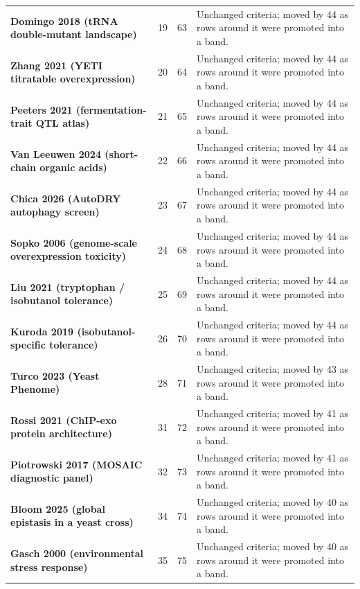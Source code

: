 \begin{longtable}{@{}L{46mm} r@{\hspace{6pt}} r@{\hspace{6pt}} L{104mm}@{}}
\addlinespace[5pt]
\textbf{Domingo 2018 (tRNA double-mutant landscape)} & 19 & 63 & Unchanged criteria; moved by 44 as rows around it were promoted into a band. \\
\addlinespace[5pt]
\textbf{Zhang 2021 (YETI titratable overexpression)} & 20 & 64 & Unchanged criteria; moved by 44 as rows around it were promoted into a band. \\
\addlinespace[5pt]
\textbf{Peeters 2021 (fermentation-trait QTL atlas)} & 21 & 65 & Unchanged criteria; moved by 44 as rows around it were promoted into a band. \\
\addlinespace[5pt]
\textbf{Van Leeuwen 2024 (short-chain organic acids)} & 22 & 66 & Unchanged criteria; moved by 44 as rows around it were promoted into a band. \\
\addlinespace[5pt]
\textbf{Chica 2026 (AutoDRY autophagy screen)} & 23 & 67 & Unchanged criteria; moved by 44 as rows around it were promoted into a band. \\
\addlinespace[5pt]
\textbf{Sopko 2006 (genome-scale overexpression toxicity)} & 24 & 68 & Unchanged criteria; moved by 44 as rows around it were promoted into a band. \\
\addlinespace[5pt]
\textbf{Liu 2021 (tryptophan / isobutanol tolerance)} & 25 & 69 & Unchanged criteria; moved by 44 as rows around it were promoted into a band. \\
\addlinespace[5pt]
\textbf{Kuroda 2019 (isobutanol-specific tolerance)} & 26 & 70 & Unchanged criteria; moved by 44 as rows around it were promoted into a band. \\
\addlinespace[5pt]
\textbf{Turco 2023 (Yeast Phenome)} & 28 & 71 & Unchanged criteria; moved by 43 as rows around it were promoted into a band. \\
\addlinespace[5pt]
\textbf{Rossi 2021 (ChIP-exo protein architecture)} & 31 & 72 & Unchanged criteria; moved by 41 as rows around it were promoted into a band. \\
\addlinespace[5pt]
\textbf{Piotrowski 2017 (MOSAIC diagnostic panel)} & 32 & 73 & Unchanged criteria; moved by 41 as rows around it were promoted into a band. \\
\addlinespace[5pt]
\textbf{Bloom 2025 (global epistasis in a yeast cross)} & 34 & 74 & Unchanged criteria; moved by 40 as rows around it were promoted into a band. \\
\addlinespace[5pt]
\textbf{Gasch 2000 (environmental stress response)} & 35 & 75 & Unchanged criteria; moved by 40 as rows around it were promoted into a band. \\

\end{longtable}
